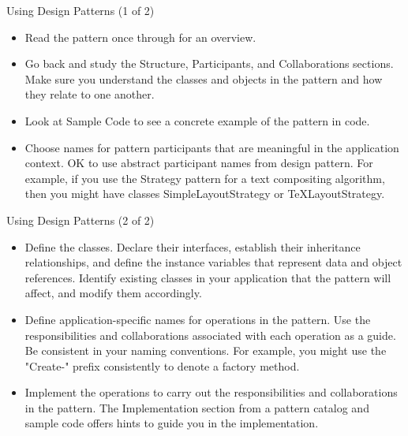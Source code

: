 \documentclass{beamer}
\begin{document}
\begin{frame}[fragile]{Using Design Patterns (1 of 2)}


\begin{itemize}
\item Read the pattern once through for an overview.
\item Go back and study the Structure, Participants, and Collaborations sections. Make sure you understand the classes and objects in the pattern and how they relate to one another.
\item Look at Sample Code to see a concrete example of the pattern in code.
\item Choose names for pattern participants that are meaningful in the application context. OK to use abstract participant names from design pattern. For example, if you use the Strategy pattern for a text compositing algorithm, then you might have classes SimpleLayoutStrategy or TeXLayoutStrategy.
\end{itemize}


\end{frame}

\begin{frame}[fragile]{Using Design Patterns (2 of 2)}


\begin{itemize}
\item Define the classes. Declare their interfaces, establish their inheritance relationships, and define the instance variables that represent data and object references. Identify existing classes in your application that the pattern will affect, and modify them accordingly.
\item Define application-specific names for operations in the pattern. Use the responsibilities and collaborations associated with each operation as a guide. Be consistent in your naming conventions. For example, you might use the "Create-" prefix consistently to denote a factory method.
\item Implement the operations to carry out the responsibilities and collaborations in the pattern. The Implementation section from a pattern catalog and sample code offers hints to guide you in the implementation.
\end{itemize}


\end{frame}
\end{document}
